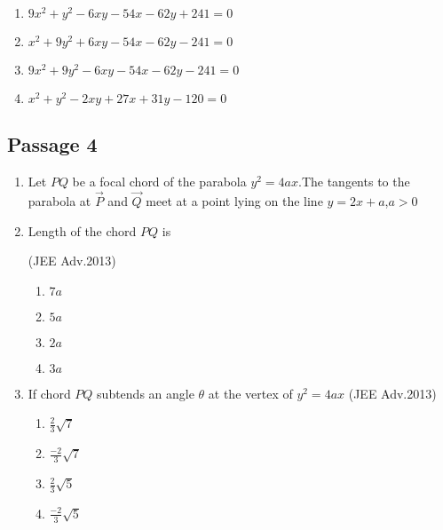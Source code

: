 \begin{enumerate}
     \item $9x^2+y^2-6xy-54x-62y+241=0$
     \item $x^2+9y^2+6xy-54x-62y-241=0$
     \item $9x^2+9y^2-6xy-54x-62y-241=0$
     \item $x^2+y^2-2xy+27x+31y-120=0$
\end{enumerate}
\subsection*{Passage 4} 
\begin{enumerate}
\item[] Let $PQ$ be a focal chord of the parabola $y^2=4ax$.The tangents to the parabola at $\Vec{P}$ and $\Vec{Q}$ meet at a point lying on the line $y=2x+a$,$a>0$
\item Length of the chord $PQ$ is

\hfill(JEE Adv.2013)        
\begin{enumerate}
    \item $7a$
    \item $5a$
    \item $2a$
    \item $3a$
\end{enumerate}

\item If chord $PQ$ subtends an angle $\theta$  at the vertex of $y^2=4ax$
\hfill(JEE Adv.2013)

\begin{enumerate}
    \item $\frac{2}{3}\sqrt{7}$
    
    \item $\frac{-2}{3}\sqrt{7}$
    
    \item $\frac{2}{3}\sqrt{5}$
    
    \item $\frac{-2}{3}\sqrt{5}$
\end{enumerate}
\end{enumerate}
